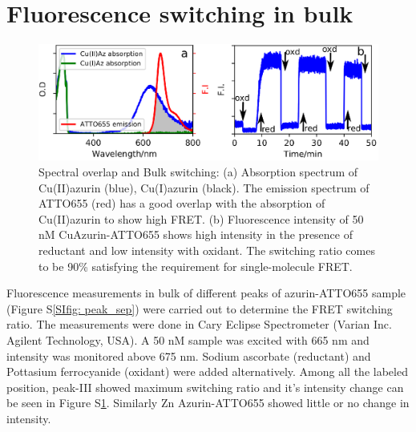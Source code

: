\documentclass[11pt,a4paper,onecolumn]{article}
\begin{document}
\section{Fluorescence switching in bulk}
\begin{figure}
  \centering
  \includegraphics{spectral_overlap_switching.eps}
  \makeatletter
  \renewcommand{\fnum@figure}{\figurename~S\thefigure}
  \makeatother
  \caption{Spectral overlap and Bulk switching: (a) Absorption spectrum of Cu(II)azurin (blue), Cu(I)azurin (black). The emission spectrum of ATTO655 (red) has a good overlap with the absorption of Cu(II)azurin to show high FRET. (b) Fluorescence intensity of 50 nM CuAzurin-ATTO655 shows high intensity in the presence of reductant and low intensity with oxidant. The switching ratio comes to be 90\% satisfying the requirement for single-molecule FRET.}
  \label{SIfig: switching}
\end{figure}
Fluorescence measurements in bulk of different peaks of azurin-ATTO655 sample (Figure S\ref{SIfig: peak_sep}) were carried out to determine the FRET switching ratio. The measurements were done in Cary Eclipse Spectrometer (Varian Inc. Agilent Technology, USA). A 50 nM sample was excited with 665 nm and intensity was monitored above 675 nm. Sodium ascorbate (reductant) and Pottasium ferrocyanide (oxidant) were added alternatively. Among all the labeled position, peak-III showed maximum switching ratio and it's intensity change can be seen in Figure S\ref{SIfig: switching}. Similarly Zn Azurin-ATTO655 showed little or no change in intensity.
\end{document}
